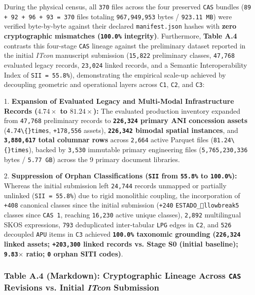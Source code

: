 \documentclass[10pt,a4paper]{article}
\begin{document}
During the physical census, all \texttt{370} files across the four preserved \texttt{CAS} bundles (\texttt{89 + 92 + 96 + 93 = 370} files totaling \texttt{967,949,953} bytes / \texttt{923.11 MB}) were verified byte-by-byte against their declared \texttt{manifest.json} hashes with \textbf{zero cryptographic mismatches (\texttt{100.0\%} integrity)}. Furthermore, \textbf{Table A.4} contrasts this four-stage \texttt{CAS} lineage against the preliminary dataset reported in the initial \textit{ITcon} manuscript submission (\texttt{15,822} preliminary classes, \texttt{47,768} evaluated legacy records, \texttt{23,024} linked records, and a Semantic Interoperability Index of \texttt{SII = 55.8\%}), demonstrating the empirical scale-up achieved by decoupling geometric and operational layers across \texttt{C1}, \texttt{C2}, and \texttt{C3}:

1. \textbf{Expansion of Evaluated Legacy and Multi-Modal Infrastructure Records ($4.74\times$ to $81.24\times$):} The evaluated production inventory expanded from \texttt{47,768} preliminary records to \textbf{\texttt{226,324} primary ANI concession assets} (\texttt{4.74\textbackslash\{\}times}, \texttt{+178,556} assets), \textbf{\texttt{226,342} bimodal spatial instances}, and \textbf{\texttt{3,880,617} total columnar rows} across \texttt{2,664} active Parquet files (\texttt{81.24\textbackslash\{\}times}), backed by \texttt{3,530} immutable primary engineering files (\texttt{5,765,230,336} bytes / \texttt{5.77 GB}) across the 9 primary document libraries.\par
2. \textbf{Suppression of Orphan Classifications (\texttt{SII} from \texttt{55.8\%} to \texttt{100.0\%}):} Whereas the initial submission left \texttt{24,744} records unmapped or partially unlinked (\texttt{SII = 55.8\%}) due to rigid monolithic coupling, the incorporation of \texttt{+408} canonical classes since the initial submission (\texttt{+240} \texttt{ESTADO\_llowbreak{}5} classes since \texttt{CAS 1}, reaching \texttt{16,230} active unique classes), \texttt{2,892} multilingual SKOS expressions, \texttt{793} deduplicated inter-tabular \texttt{LPG} edges in \texttt{C2}, and \texttt{526} decoupled \texttt{APU} items in \texttt{C3} achieved \textbf{\texttt{100.0\%} taxonomic grounding (\texttt{226,324} linked assets; \texttt{+203,300} linked records vs. Stage S0 (initial baseline); \texttt{9.83$\times$} ratio; \texttt{0} orphan SITI codes)}.\par

\subsubsection*{Table A.4 (Markdown): Cryptographic Lineage Across \texttt{CAS} Revisions vs. Initial \textit{ITcon} Submission}
\end{document}
